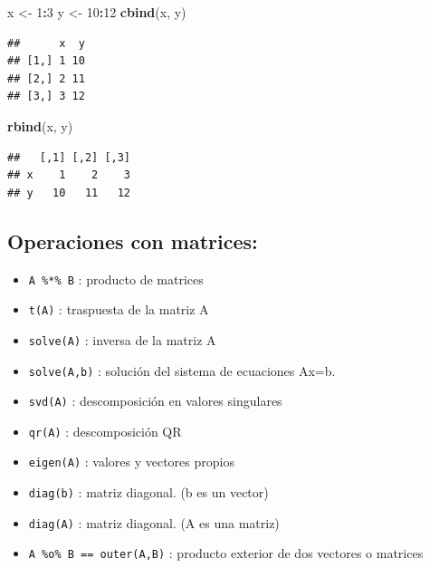 \documentclass[]{book}
\newenvironment{Shaded}{\begin{snugshade}}{\end{snugshade}}
\newcommand{\KeywordTok}[1]{\textcolor[rgb]{0.13,0.29,0.53}{\textbf{#1}}}
\newcommand{\DecValTok}[1]{\textcolor[rgb]{0.00,0.00,0.81}{#1}}
\newcommand{\StringTok}[1]{\textcolor[rgb]{0.31,0.60,0.02}{#1}}
\newcommand{\OperatorTok}[1]{\textcolor[rgb]{0.81,0.36,0.00}{\textbf{#1}}}
\newcommand{\NormalTok}[1]{#1}
\providecommand{\tightlist}{%
  \setlength{\itemsep}{0pt}\setlength{\parskip}{0pt}}
\begin{document}
\begin{Shaded}
\begin{Highlighting}[]
\NormalTok{x <-}\StringTok{ }\DecValTok{1}\OperatorTok{:}\DecValTok{3}
\NormalTok{y <-}\StringTok{ }\DecValTok{10}\OperatorTok{:}\DecValTok{12}
\KeywordTok{cbind}\NormalTok{(x, y)}
\end{Highlighting}
\end{Shaded}

\begin{verbatim}
##      x  y
## [1,] 1 10
## [2,] 2 11
## [3,] 3 12
\end{verbatim}

\begin{Shaded}
\begin{Highlighting}[]
\KeywordTok{rbind}\NormalTok{(x, y) }
\end{Highlighting}
\end{Shaded}

\begin{verbatim}
##   [,1] [,2] [,3]
## x    1    2    3
## y   10   11   12
\end{verbatim}

\hypertarget{operaciones-con-matrices}{%
\subsection{Operaciones con matrices:}\label{operaciones-con-matrices}}

\begin{itemize}
\tightlist
\item
  \texttt{A\ \%*\%\ B} : producto de matrices
\item
  \texttt{t(A)} : traspuesta de la matriz A
\item
  \texttt{solve(A)} : inversa de la matriz A
\item
  \texttt{solve(A,b)} : solución del sistema de ecuaciones Ax=b.
\item
  \texttt{svd(A)} : descomposición en valores singulares
\item
  \texttt{qr(A)} : descomposición QR
\item
  \texttt{eigen(A)} : valores y vectores propios
\item
  \texttt{diag(b)} : matriz diagonal. (b es un vector)
\item
  \texttt{diag(A)} : matriz diagonal. (A es una matriz)
\item
  \texttt{A\ \%o\%\ B\ ==\ outer(A,B)} : producto exterior de dos
  vectores o matrices
\end{itemize}
\end{document}
